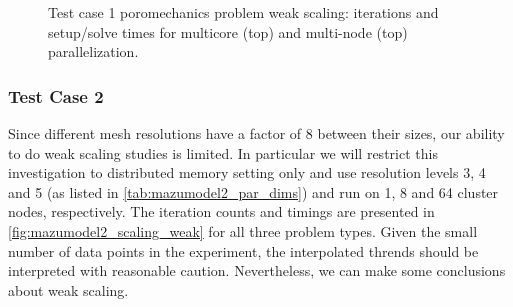 \begin{figure} [htbp]
  \begin{subfigure}[t]{0.48\textwidth}
    \centering
    
  \end{subfigure}
  \hfill
  \begin{subfigure}[t]{0.48\textwidth}
    \centering
    
  \end{subfigure}
  \begin{subfigure}[t]{0.48\textwidth}
    \centering
    
  \end{subfigure}
  \hfill
  \begin{subfigure}[t]{0.48\textwidth}
    \centering
    
  \end{subfigure}
  \caption[Test case 1 poromechanics problem weak scaling]{Test case 1 poromechanics problem weak scaling: iterations and setup/solve times for multicore (top) and multi-node (top) parallelization.}
  \label{fig:cart_scaling_weak_poro}
\end{figure}

\subsubsection{Test Case 2}

Since different mesh resolutions have a factor of 8 between their sizes, our ability to do weak scaling studies is limited.   In particular we will restrict this investigation to distributed memory setting only and use resolution levels 3, 4 and 5 (as listed in \cref{tab:mazumodel2_par_dims}) and run on 1, 8 and 64 cluster nodes, respectively.   The iteration counts and timings are presented in \cref{fig:mazumodel2_scaling_weak} for all three problem types.   Given the small number of data points in the experiment, the interpolated thrends should be interpreted with reasonable caution.   Nevertheless, we can make some conclusions about weak scaling.

